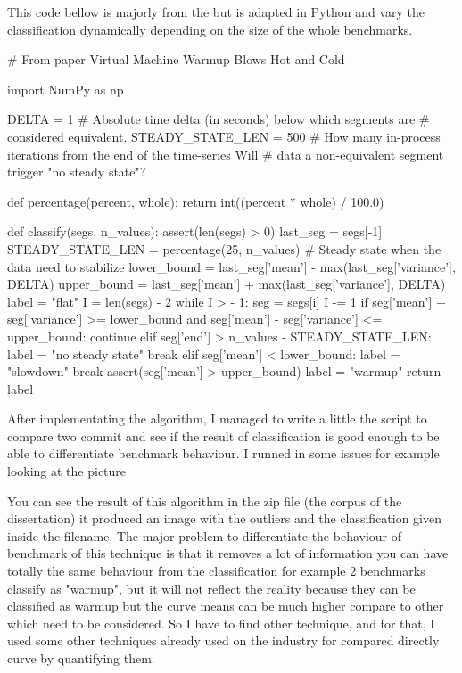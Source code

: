 \documentclass{article}
\begin{document}
This code bellow is majorly from the \citep{barrett2017virtual} but is adapted in Python and vary the classification dynamically depending on the size of the whole benchmarks.
\begin{python}[h!]

# From paper Virtual Machine Warmup Blows Hot and Cold

import NumPy as np


DELTA = 1  # Absolute time delta (in seconds) below which segments are
# considered equivalent.
STEADY_STATE_LEN = 500  # How many in-process iterations from the end of the time-series
Will # data a non-equivalent segment trigger "no steady state"?


def percentage(percent, whole):
    return int((percent * whole) / 100.0)


def classify(segs, n_values):
    assert(len(segs) > 0)
    last_seg = segs[-1]
    STEADY_STATE_LEN = percentage(25, n_values) # Steady state when the data need to stabilize
    lower_bound = last_seg['mean'] - max(last_seg['variance'], DELTA)
    upper_bound = last_seg['mean'] + max(last_seg['variance'], DELTA)
    label = "flat"
    I = len(segs) - 2
    while I > - 1:
        seg = segs[i]
        I -= 1
        if seg['mean'] + seg['variance'] >= lower_bound and seg['mean'] - seg['variance'] <= upper_bound:
            continue
        elif seg['end'] > n_values - STEADY_STATE_LEN:
            label = "no steady state"
            break
        elif seg['mean'] < lower_bound:
            label = "slowdown"
            break
        assert(seg['mean'] > upper_bound)
        label = "warmup"
    return label
\end{python}

After implementating the algorithm, I managed to write a little the script to compare two commit and see if the result of classification is good enough to be able to differentiate benchmark behaviour.
I runned in some issues for example looking at the picture


You can see the result of this algorithm in the zip file (the corpus of the dissertation) it produced an image with the outliers and the classification given inside the filename.
The major problem to differentiate the behaviour of benchmark of this technique is that it removes a lot of information you can have totally the same behaviour from the classification for example 2 benchmarks classify as "warmup", but it will not reflect the reality because they can be classified as warmup but the curve means can be much higher compare to other which need to be considered. So I have to find other technique, and for that, I used some other techniques already used on the industry for compared directly curve by quantifying them.
\end{document}
